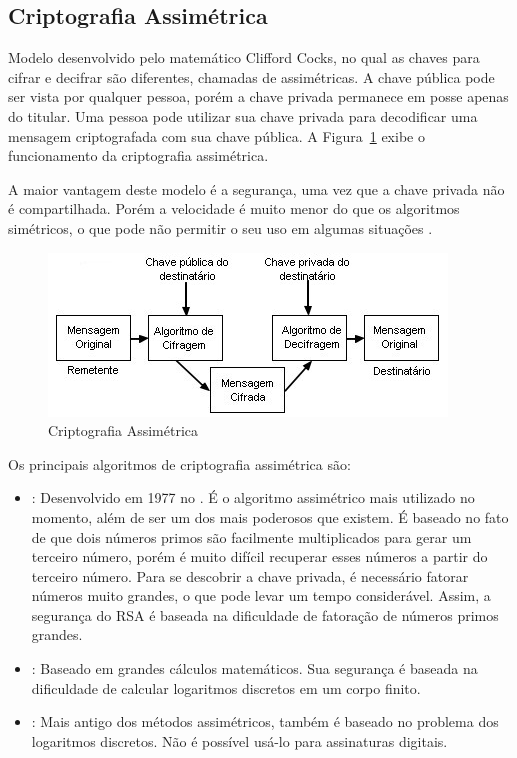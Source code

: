 \subsection{Criptografia Assimétrica}

Modelo desenvolvido pelo matemático Clifford Cocks, no qual as chaves para cifrar e decifrar são diferentes, chamadas de assimétricas. A chave pública pode ser vista por qualquer pessoa, porém a chave privada permanece em posse apenas do titular. Uma pessoa pode utilizar sua chave privada para decodificar uma mensagem criptografada com sua chave pública. A Figura~\ref{fig:cripasim} exibe o funcionamento da criptografia assimétrica.

A maior vantagem deste modelo é a segurança, uma vez que a chave privada não é compartilhada. Porém a velocidade é muito menor do que os algoritmos simétricos, o que pode não permitir o seu uso em algumas situações \cite{Stallings2014}.

\begin{figure}[t]
    \centering
    \includegraphics{Images/Assimetrica.jpg}
    \caption{Criptografia Assimétrica}\label{fig:cripasim}
\end{figure}

Os principais algoritmos de criptografia assimétrica são:
\begin{itemize}
    \item \rsa: Desenvolvido em 1977 no \mitt. É o algoritmo assimétrico mais utilizado no momento, além de ser um dos mais poderosos que existem. É baseado no fato de que dois números primos são facilmente multiplicados para gerar um terceiro número, porém é muito difícil recuperar esses números a partir do terceiro número. Para se descobrir a chave privada, é necessário fatorar números muito grandes, o que pode levar um tempo considerável. Assim, a segurança do RSA é baseada na dificuldade de fatoração de números primos grandes.
    \item \elgamal: Baseado em grandes cálculos matemáticos. Sua segurança é baseada na dificuldade de calcular logaritmos discretos em um corpo finito.
    \item \dhes: Mais antigo dos métodos assimétricos, também é baseado no problema dos logaritmos discretos. Não é possível usá-lo para assinaturas digitais.
\end{itemize}

